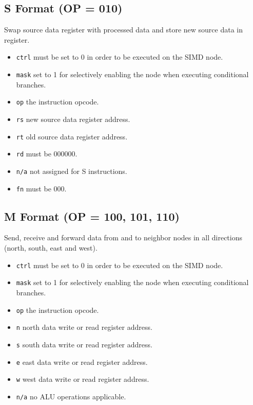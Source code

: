 

\subsection[S Format]{S Format (OP = 010)}
Swap source data register with processed data and store new source data in
register.



\begin{itemize}
\item {\tt ctrl} must be set to 0 in order to be executed on the SIMD node.
\item {\tt mask} set to 1 for selectively enabling the node when executing
  conditional branches.
\item {\tt op} the instruction opcode.
\item {\tt rs} new source data register address.
\item {\tt rt} old source data register address.
\item {\tt rd} must be 000000.
\item {\tt n/a} not assigned for S instructions.
\item {\tt fn} must be 000.
\end{itemize}



\subsection[M Format]{M Format (OP = 100, 101, 110)}
Send, receive and forward data from and to neighbor nodes in all directions
(north, south, east and west).



\begin{itemize}
\item {\tt ctrl} must be set to 0 in order to be executed on the SIMD node.
\item {\tt mask} set to 1 for selectively enabling the node when executing
  conditional branches.
\item {\tt op} the instruction opcode.
\item {\tt n} north data write or read register address.
\item {\tt s} south data write or read register address.
\item {\tt e} east data write or read register address.
\item {\tt w} west data write or read register address.
\item {\tt n/a} no ALU operations applicable.
\end{itemize}

